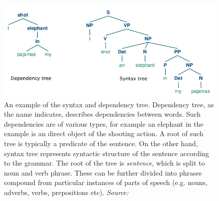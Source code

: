 \begin{figure}[h]
\centering
\includegraphics[width=1\textwidth]{../img/syntax_depedency_trees.png}
\caption{
An example of the syntax and dependency tree. Dependency tree, as the name indicates, describes dependencies between words. Such dependencies are of various types, for example an elephant in the example is an direct object of the shooting action. A root of such tree is typically a predicate of the sentence. On the other hand, syntax tree represents syntactic structure of the sentence according to the grammar. The root of the tree is \textit{sentence}, which is split to noun and verb phrase. These can be further divided into phrases compound from particular instances of parts of speech (e.g. nouns, adverbs, verbs, prepositions etc).
\newline \textit{Source: \cite{NLTKbook}}}
\label{fig:trees}
\end{figure}

